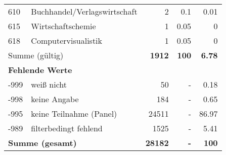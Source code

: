 \begin{longtable}{lXrrr}
        610 & \multicolumn{1}{X}{Buchhandel/Verlagswirtschaft} & %
          \num{2} &
          \num[round-mode=places,round-precision=2]{0.1} &
          \num[round-mode=places,round-precision=2]{0.01} \\

        615 & \multicolumn{1}{X}{Wirtschaftschemie} & %
          \num{1} &
          \num[round-mode=places,round-precision=2]{0.05} &
          \num[round-mode=places,round-precision=2]{0} \\

        618 & \multicolumn{1}{X}{Computervisualistik} & %
          \num{1} &
          \num[round-mode=places,round-precision=2]{0.05} &
          \num[round-mode=places,round-precision=2]{0} \\

     \midrule
     \multicolumn{2}{l}{Summe (gültig)} &
       \textbf{\num{1912}} &
     \textbf{100} &
       \textbf{\num[round-mode=places,round-precision=2]{6.78}} \\
     \multicolumn{5}{l}{\textbf{Fehlende Werte}}\\
       -999 &
       weiß nicht &
         \num{50} &
        - &
         \num[round-mode=places,round-precision=2]{0.18} \\
       -998 &
       keine Angabe &
         \num{184} &
        - &
         \num[round-mode=places,round-precision=2]{0.65} \\
       -995 &
       keine Teilnahme (Panel) &
         \num{24511} &
        - &
         \num[round-mode=places,round-precision=2]{86.97} \\
       -989 &
       filterbedingt fehlend &
         \num{1525} &
        - &
         \num[round-mode=places,round-precision=2]{5.41} \\
     \midrule
     \multicolumn{2}{l}{\textbf{Summe (gesamt)}} &
          \textbf{\num{28182}} &
        \textbf{-} &
        \textbf{100} \\
     \bottomrule
     \end{longtable}
     
